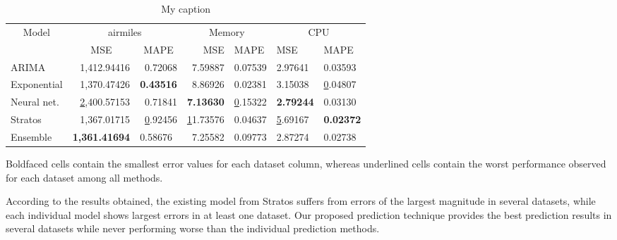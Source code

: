 \begin{table}[]
\centering
\caption{My caption}
\label{my-label}
\begin{tabular}{|l|r|r|r|l|l|l|}
\hline
\multicolumn{1}{|c|}{\multirow{2}{*}{Model}} & \multicolumn{2}{c|}{airmiles}                                            & \multicolumn{2}{c|}{Memory}      & \multicolumn{2}{c|}{CPU}            \\ \cline{2-7} 
\multicolumn{1}{|c|}{}                       & \multicolumn{1}{c|}{MSE}                  & \multicolumn{1}{c|}{MAPE}    & MSE              & MAPE          & MSE              & MAPE             \\ \hline
ARIMA                                        & 1,412.94416                               & 0.72068                      & 7.59887          & 0.07539       & 2.97641          & 0.03593          \\ \hline
Exponential                                  & 1,370.47426                               & \textbf{0.43516}             & 8.86926          & 0.02381       & 3.15038          & {\ul 0.04807}    \\ \hline
Neural net.                                  & {\ul 2,400.57153}                         & 0.71841                      & \textbf{7.13630} & {\ul 0.15322} & \textbf{2.79244} & 0.03130          \\ \hline
Stratos                                      & 1,367.01715                               & {\ul 0.92456}                & {\ul 11.73576}   & 0.04637       & {\ul 5.69167}    & \textbf{0.02372} \\ \hline
Ensemble                                     & \multicolumn{1}{l|}{\textbf{1,361.41694}} & \multicolumn{1}{l|}{0.58676} & 7.25582          & 0.09773       & 2.87274          & 0.02738          \\ \hline
\end{tabular}
\end{table}

Boldfaced cells contain the smallest error values for each dataset column, whereas underlined cells contain the worst performance observed for each dataset among all methods. 

According to the results obtained, the existing model from Stratos suffers from errors of the largest magnitude in several datasets, while each individual model shows largest errors in at least one dataset. Our proposed prediction technique provides the best prediction results in several datasets while never performing worse than the individual prediction methods.